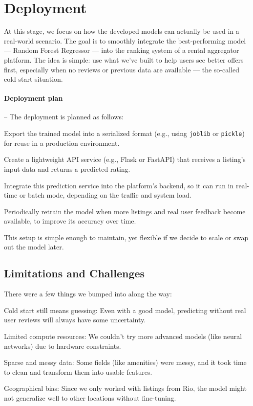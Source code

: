 \section{Deployment}
\label{chap:deployment}

At this stage, we focus on how the developed models can actually be used in a real-world scenario. The goal is to smoothly integrate the best-performing model — Random Forest Regressor — into the ranking system of a rental aggregator platform. The idea is simple: use what we’ve built to help users see better offers first, especially when no reviews or previous data are available — the so-called cold start situation.

\paragraph{Deployment plan} –
The deployment is planned as follows:

Export the trained model into a serialized format (e.g., using \texttt{joblib} or \texttt{pickle}) for reuse in a production environment.

Create a lightweight API service (e.g., Flask or FastAPI) that receives a listing’s input data and returns a predicted rating.

Integrate this prediction service into the platform’s backend, so it can run in real-time or batch mode, depending on the traffic and system load.

Periodically retrain the model when more listings and real user feedback become available, to improve its accuracy over time.

This setup is simple enough to maintain, yet flexible if we decide to scale or swap out the model later.

\subsection{Limitations and Challenges }
\label{sec:limitation}

There were a few things we bumped into along the way:

Cold start still means guessing: Even with a good model, predicting without real user reviews will always have some uncertainty.

Limited compute resources: We couldn't try more advanced models (like neural networks) due to hardware constraints.

Sparse and messy data: Some fields (like amenities) were messy, and it took time to clean and transform them into usable features.

Geographical bias: Since we only worked with listings from Rio, the model might not generalize well to other locations without fine-tuning.

